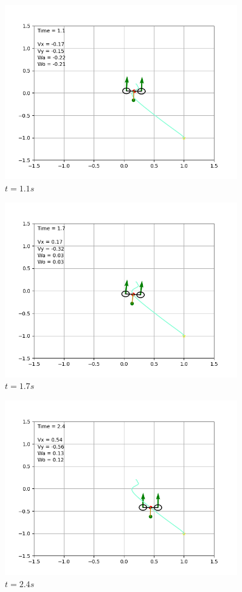 \begin{figure}[H]
\centering
\includegraphics[width=0.9\textwidth]{pictures/ani11.png}
\caption{$t = 1.1s$}
\label{fig:ani11}
\end{figure}

\begin{figure}[H]
\centering
\includegraphics[width=0.9\textwidth]{pictures/ani17.png}
\caption{$t = 1.7s$}
\label{fig:ani17}
\end{figure}

\begin{figure}[H]
\centering
\includegraphics[width=0.9\textwidth]{pictures/ani24.png}
\caption{$t = 2.4s$}
\label{fig:ani24}
\end{figure}

